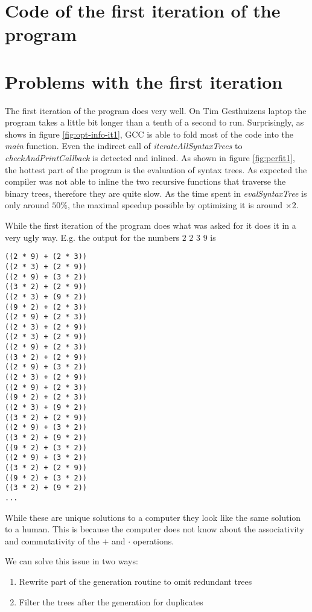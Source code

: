 \documentclass[11pt,a4paper]{article}
\newcommand{\code}[1]{\textit{#1}}
\begin{document}
\section{Code of the first iteration of the program}



\section{Problems with the first iteration}

The first iteration of the program does very well. On Tim Gesthuizens
laptop the program takes a little bit longer than a tenth of a second
to run.
Surprisingly, as shows in figure \ref{fig:opt-info-it1}, GCC is able to
fold most of the code into the \code{main} function.
Even the indirect call of \textit{iterateAllSyntaxTrees} to
\code{checkAndPrintCallback} is detected and inlined.
As shown in figure \ref{fig:perfit1}, the hottest part of the program
is the evaluation of syntax trees.
As expected the compiler was not able to inline the two recursive
functions that traverse the binary trees, therefore they are quite
slow.
As the time spent in \code{evalSyntaxTree} is only around $50\%$,
the maximal speedup possible by optimizing it is around $\times 2$.

While the first iteration of the program does what was asked for it
does it in a very ugly way. E.g. the output for the numbers $2$ $2$ $3$ $9$
is
\begin{multicols}{2}
\begin{verbatim}
((2 * 9) + (2 * 3))
((2 * 3) + (2 * 9))
((2 * 9) + (3 * 2))
((3 * 2) + (2 * 9))
((2 * 3) + (9 * 2))
((9 * 2) + (2 * 3))
((2 * 9) + (2 * 3))
((2 * 3) + (2 * 9))
((2 * 3) + (2 * 9))
((2 * 9) + (2 * 3))
((3 * 2) + (2 * 9))
((2 * 9) + (3 * 2))
((2 * 3) + (2 * 9))
((2 * 9) + (2 * 3))
((9 * 2) + (2 * 3))
((2 * 3) + (9 * 2))
((3 * 2) + (2 * 9))
((2 * 9) + (3 * 2))
((3 * 2) + (9 * 2))
((9 * 2) + (3 * 2))
((2 * 9) + (3 * 2))
((3 * 2) + (2 * 9))
((9 * 2) + (3 * 2))
((3 * 2) + (9 * 2))
...
\end{verbatim}
\end{multicols}

While these are unique solutions to a computer they look like the same
solution to a human. This is because the computer does not know about
the associativity and commutativity of the $+$ and $\cdot$
operations.

We can solve this issue in two ways:
\begin{enumerate}
\item \label{opt:rewrite} Rewrite part of the generation routine to
  omit redundant trees
\item \label{opt:filter} Filter the trees after the generation for
  duplicates
\end{enumerate}
\end{document}
